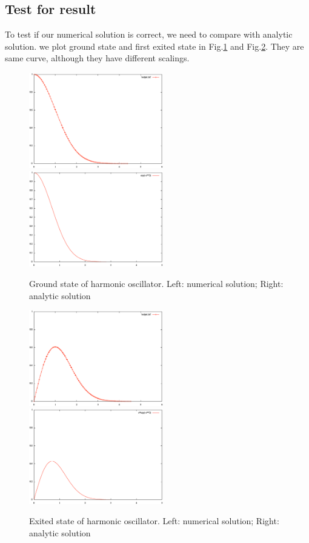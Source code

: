 \documentclass{article}
\begin{document}
\subsection{Test for result}
To test if our numerical solution is correct, we need to compare with analytic solution. we plot ground state and first exited state in Fig.\ref{ground} and Fig.\ref{exited}. They are same curve, although they have different scalings.
\begin{figure}
    \centering
    \includegraphics[width=2.3in]{ground_num.eps}
    \includegraphics[width=2.3in]{ground_asol.eps}
    \caption{Ground state of harmonic oscillator. Left: numerical solution; Right:  analytic solution}
    \label{ground}
\end{figure}
\begin{figure}
    \centering
    \includegraphics[width=2.3in]{1st_num.eps}
    \includegraphics[width=2.3in]{1st_asol.eps}
    \caption{Exited state of harmonic oscillator. Left: numerical solution; Right:  analytic solution}
    \label{exited}
\end{figure}
\end{document}
